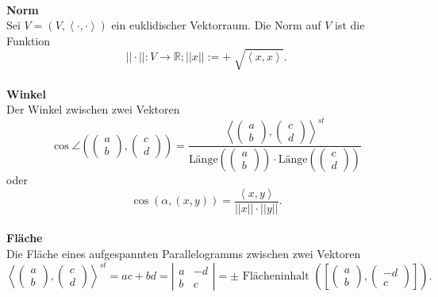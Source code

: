 \documentclass[a4paper,12pt]{article}
\numberwithin{equation}{section}
\begin{document}
\hfill\\\textbf{Norm}\\ 
Sei $V=\left(V,\left\langle \cdot ,\cdot \right\rangle \right)$ ein euklidischer Vektorraum. Die Norm auf $V$ ist die Funktion
\[ 
        ||\cdot ||:V\rightarrow \mathbb{R};||x||:=+\sqrt[]{\left\langle x,x\right\rangle }
.\] 
\hfill\\\textbf{Winkel}\\ 
Der Winkel zwischen zwei Vektoren
\[ 
        \cos \angle\left(\left(\begin{matrix}
                a\\b
        \end{matrix}\right),\left(\begin{matrix}
                c\\d
        \end{matrix}\right)\right)=\dfrac{\left\langle \left(\begin{matrix}
                a\\b
        \end{matrix}\right),\left(\begin{matrix}
                c\\d
        \end{matrix}\right)\right\rangle ^{s t}}{\text{Länge}\left(\left(\begin{matrix}
                a\\b
        \end{matrix}\right)\right)\cdot \text{Länge}\left(\left(\begin{matrix}
                c\\d
        \end{matrix}\right)\right)}
\] 
oder
\[ 
        \cos \left(\alpha ,\left(x,y\right)\right)=\dfrac{\left\langle x,y\right\rangle }{||x||\cdot ||y||}
.\] 
\hfill\\\textbf{Fläche}\\ 
Die Fläche eines aufgespannten Parallelogramms zwischen zwei Vektoren
\[ 
        \left\langle \left(\begin{matrix}
                a\\b
        \end{matrix}\right),\left(\begin{matrix}
                c\\d
        \end{matrix}\right)\right\rangle ^{s t}=ac+bd=\left|\begin{matrix}
        a&-d\\b&c
        \end{matrix}\right|=\pm\text{ Flächeninhalt } \left(\left[\left(\begin{matrix}
                a\\b
        \end{matrix}\right),\left(\begin{matrix}
                -d\\c
        \end{matrix}\right)\right]\right)
.\] 
\end{document}
